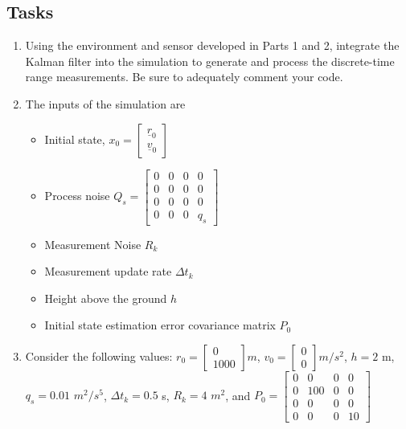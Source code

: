 \documentclass{article}
\begin{document}
\subsection{Tasks}

\begin{enumerate}
    \item Using the environment and sensor developed in Parts 1 and 2, integrate the Kalman filter into the simulation to generate and process the discrete-time range measurements. Be sure to adequately comment your code.
    \item The inputs of the simulation are
    \begin{itemize}
        \item Initial state, $x_0 = \begin{bmatrix}
            \underline{r}_0 \\ \underline{v}_0
        \end{bmatrix}$
        \item Process noise $Q_s = \begin{bmatrix} 0 & 0 & 0 & 0 \\ 0 & 0 & 0 & 0 \\ 0 & 0 & 0 & 0 \\ 0 & 0 & 0 & q_s 
        \end{bmatrix}$
        \item Measurement Noise $R_k$
        \item Measurement update rate $\Delta t_k$
        \item Height above the ground $h$
        \item Initial state estimation error covariance matrix $P_0$
    \end{itemize}
    \item Consider the following values: $r_0 = \begin{bmatrix}
        0 \\ 1000
    \end{bmatrix} m$, $v_0 = \begin{bmatrix}
        0 \\ 0
    \end{bmatrix} m/s^2$, $h = 2$ m, $q_s = 0.01$ $m^2/s^5$, $\Delta t_k = 0.5$ s, $R_k = 4$ $m^2$, and $P_0 = 
    \begin{bmatrix} 0 & 0 & 0 & 0 \\ 0 & 100 & 0 & 0 \\ 0 & 0 & 0 & 0 \\ 0 & 0 & 0 & 10 
    \end{bmatrix}$
\end{enumerate}
\end{document}
